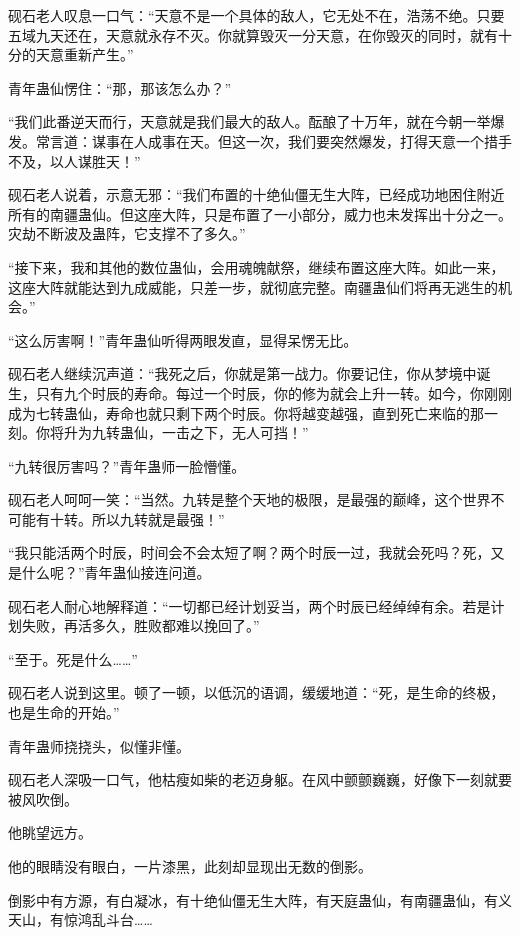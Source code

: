 
\begin{this_body}

砚石老人叹息一口气：“天意不是一个具体的敌人，它无处不在，浩荡不绝。只要五域九天还在，天意就永存不灭。你就算毁灭一分天意，在你毁灭的同时，就有十分的天意重新产生。”

青年蛊仙愣住：“那，那该怎么办？”

“我们此番逆天而行，天意就是我们最大的敌人。酝酿了十万年，就在今朝一举爆发。常言道：谋事在人成事在天。但这一次，我们要突然爆发，打得天意一个措手不及，以人谋胜天！”

砚石老人说着，示意无邪：“我们布置的十绝仙僵无生大阵，已经成功地困住附近所有的南疆蛊仙。但这座大阵，只是布置了一小部分，威力也未发挥出十分之一。灾劫不断波及蛊阵，它支撑不了多久。”

“接下来，我和其他的数位蛊仙，会用魂魄献祭，继续布置这座大阵。如此一来，这座大阵就能达到九成威能，只差一步，就彻底完整。南疆蛊仙们将再无逃生的机会。”

“这么厉害啊！”青年蛊仙听得两眼发直，显得呆愣无比。

砚石老人继续沉声道：“我死之后，你就是第一战力。你要记住，你从梦境中诞生，只有九个时辰的寿命。每过一个时辰，你的修为就会上升一转。如今，你刚刚成为七转蛊仙，寿命也就只剩下两个时辰。你将越变越强，直到死亡来临的那一刻。你将升为九转蛊仙，一击之下，无人可挡！”

“九转很厉害吗？”青年蛊师一脸懵懂。

砚石老人呵呵一笑：“当然。九转是整个天地的极限，是最强的巅峰，这个世界不可能有十转。所以九转就是最强！”

“我只能活两个时辰，时间会不会太短了啊？两个时辰一过，我就会死吗？死，又是什么呢？”青年蛊仙接连问道。

砚石老人耐心地解释道：“一切都已经计划妥当，两个时辰已经绰绰有余。若是计划失败，再活多久，胜败都难以挽回了。”

“至于。死是什么……”

砚石老人说到这里。顿了一顿，以低沉的语调，缓缓地道：“死，是生命的终极，也是生命的开始。”

青年蛊师挠挠头，似懂非懂。

砚石老人深吸一口气，他枯瘦如柴的老迈身躯。在风中颤颤巍巍，好像下一刻就要被风吹倒。

他眺望远方。

他的眼睛没有眼白，一片漆黑，此刻却显现出无数的倒影。

倒影中有方源，有白凝冰，有十绝仙僵无生大阵，有天庭蛊仙，有南疆蛊仙，有义天山，有惊鸿乱斗台……


\end{this_body}
